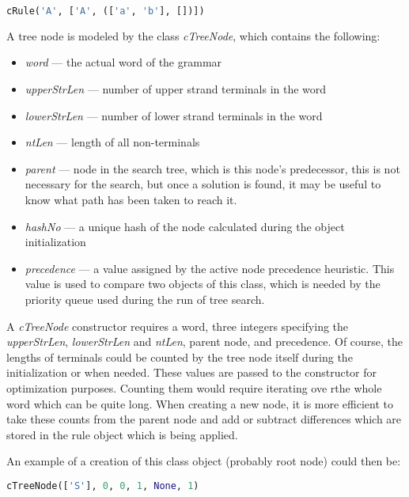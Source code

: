 \begin{lstlisting}[language=Python]
  cRule('A', ['A', (['a', 'b'], [])])
\end{lstlisting}

\bigskip

A tree node is modeled by the class \textit{cTreeNode}, which contains the following:
\begin{itemize}
  \item{\textit{word} --- the actual word of the grammar}
  \item{\textit{upperStrLen} --- number of upper strand terminals in the word}
  \item{\textit{lowerStrLen} --- number of lower strand terminals in the word}
  \item{\textit{ntLen} --- length of all non-terminals}
  \item{\textit{parent} --- node in the search tree, which is this node's  predecessor, this is not necessary for the search, but once a solution is found, it may be useful to know what path has been taken to reach it.}
  \item{\textit{hashNo} --- a unique hash of the node calculated during the object initialization}
  \item{\textit{precedence} --- a value assigned by the active node precedence heuristic. This value is used to compare two objects of this class, which is needed by the priority queue used during the run of tree search.}
\end{itemize}

A \textit{cTreeNode} constructor requires a word, three integers specifying the \textit{upperStrLen}, \textit{lowerStrLen} and \textit{ntLen}, parent node, and precedence. Of course, the lengths of terminals could be counted by the tree node itself during the initialization or when needed. These values are passed to the constructor for optimization purposes. Counting them would require iterating ove rthe whole word which can be quite long. When creating a new node, it is more efficient to take these counts from the parent node and add or subtract differences which are stored in the rule object which is being applied.

An example of a creation of this class object (probably root node) could then be:

\begin{lstlisting}[language=Python]
  cTreeNode(['S'], 0, 0, 1, None, 1)
\end{lstlisting}

\bigskip

